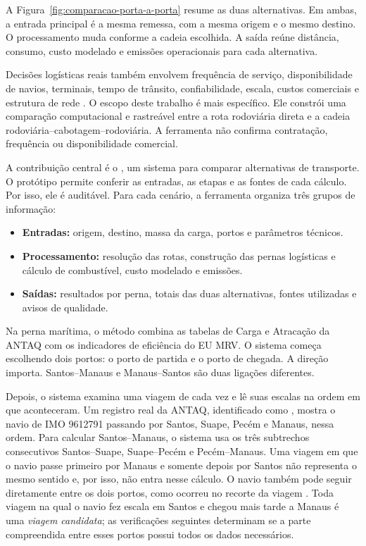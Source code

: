 A Figura~\ref{fig:comparacao-porta-a-porta} resume as duas alternativas. Em ambas, a entrada principal é a mesma remessa, com a mesma origem e o mesmo destino. O processamento muda conforme a cadeia escolhida. A saída reúne distância, consumo, custo modelado e emissões operacionais para cada alternativa.

Decisões logísticas reais também envolvem frequência de serviço, disponibilidade de navios, terminais, tempo de trânsito, confiabilidade, escala, custos comerciais e estrutura de rede \cite{competitiveness2024,modalshiftreview2020}. O escopo deste trabalho é mais específico. Ele constrói uma comparação computacional e rastreável entre a rota rodoviária direta e a cadeia rodoviária--cabotagem--rodoviária. A ferramenta não confirma contratação, frequência ou disponibilidade comercial.

A contribuição central é o \CabotageLens{}, um sistema para comparar alternativas de transporte. O protótipo permite conferir as entradas, as etapas e as fontes de cada cálculo. Por isso, ele é auditável. Para cada cenário, a ferramenta organiza três grupos de informação:

\begin{itemize}
  \item \textbf{Entradas:} origem, destino, massa da carga, portos e parâmetros técnicos.
  \item \textbf{Processamento:} resolução das rotas, construção das pernas logísticas e cálculo de combustível, custo modelado e emissões.
  \item \textbf{Saídas:} resultados por perna, totais das duas alternativas, fontes utilizadas e avisos de qualidade.
\end{itemize}

Na perna marítima, o método combina as tabelas de Carga e Atracação da ANTAQ com os indicadores de eficiência do EU MRV. O sistema começa escolhendo dois portos: o porto de partida e o porto de chegada. A direção importa. Santos--Manaus e Manaus--Santos são duas ligações diferentes.

Depois, o sistema examina uma viagem de cada vez e lê suas escalas na ordem em que aconteceram. Um registro real da ANTAQ, identificado como , mostra o navio de IMO 9612791 passando por Santos, Suape, Pecém e Manaus, nessa ordem. Para calcular Santos--Manaus, o sistema usa os três subtrechos consecutivos Santos--Suape, Suape--Pecém e Pecém--Manaus. Uma viagem em que o navio passe primeiro por Manaus e somente depois por Santos não representa o mesmo sentido e, por isso, não entra nesse cálculo. O navio também pode seguir diretamente entre os dois portos, como ocorreu no recorte da viagem . Toda viagem na qual o navio fez escala em Santos e chegou mais tarde a Manaus é uma \emph{viagem candidata}; as verificações seguintes determinam se a parte compreendida entre esses portos possui todos os dados necessários.

